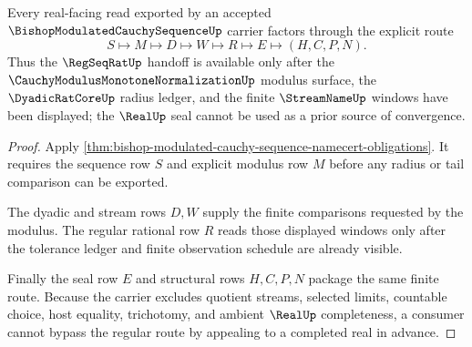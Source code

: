 \begin{theorem}
\label{thm:bishop-modulated-cauchy-sequence-regular-route}
Every real-facing read exported by an accepted $\BishopModulatedCauchySequenceUp$ carrier factors through the explicit route
$$
S\longmapsto M\longmapsto D\longmapsto W\longmapsto R\longmapsto E\longmapsto(H,C,P,N).
$$
Thus the $\RegSeqRatUp$ handoff is available only after the $\CauchyModulusMonotoneNormalizationUp$ modulus surface, the $\DyadicRatCoreUp$ radius ledger, and the finite $\StreamNameUp$ windows have been displayed; the $\RealUp$ seal cannot be used as a prior source of convergence.
\end{theorem}
\begin{proof}
Apply \autoref{thm:bishop-modulated-cauchy-sequence-namecert-obligations}. It requires the sequence row $S$ and explicit modulus row $M$ before any radius or tail comparison can be exported.

The dyadic and stream rows $D,W$ supply the finite comparisons requested by the modulus. The regular rational row $R$ reads those displayed windows only after the tolerance ledger and finite observation schedule are already visible.

Finally the seal row $E$ and structural rows $H,C,P,N$ package the same finite route. Because the carrier excludes quotient streams, selected limits, countable choice, host equality, trichotomy, and ambient $\RealUp$ completeness, a consumer cannot bypass the regular route by appealing to a completed real in advance.
\end{proof}




